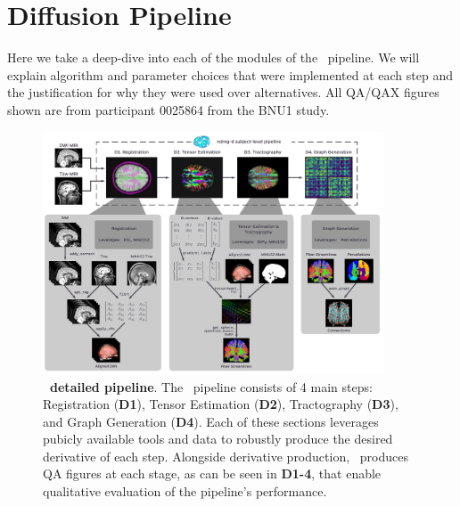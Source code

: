 \documentclass[11pt]{article}
\begin{document}
\section{Diffusion  Pipeline} \label{app:dpipe}

Here we take a deep-dive into each of the modules of the \ndmgd~pipeline. We will explain algorithm and parameter
choices that were implemented at each step and the justification for why they were used over alternatives. All QA/QAX figures shown are from participant 0025864 from the BNU1 \cite{corr} study.


\begin{figure}[b!]
\centering
\includegraphics[width=0.9\textwidth]{figs/fig_dwi_details.png}
\caption{\textbf{\ndmgd~detailed pipeline}. The \ndmgd~pipeline consists of 4 main steps: Registration (\textbf{D1}),
Tensor Estimation (\textbf{D2}), Tractography (\textbf{D3}), and Graph Generation (\textbf{D4}). Each of these sections
leverages pubicly available tools and data to robustly produce the desired derivative of each step. Alongside
derivative production, \ndmg~produces QA figures at each stage, as can be seen in \textbf{D1-4}, that enable
qualitative evaluation of the pipeline's performance.}
\label{fig:ndmgdetails}
\end{figure}
\end{document}
